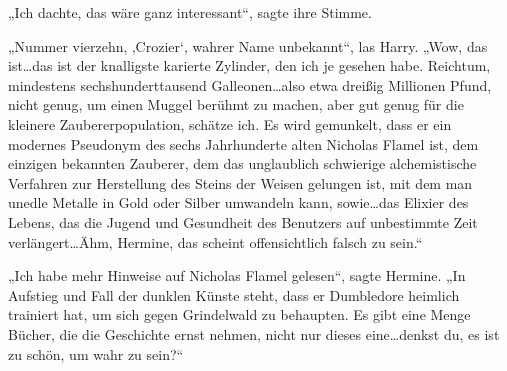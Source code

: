 „Ich dachte, das wäre ganz interessant“, sagte ihre Stimme.

„Nummer vierzehn, ‚Crozier‘, wahrer Name unbekannt“, las Harry. „Wow, das ist…das ist der knalligste karierte Zylinder, den ich je gesehen habe. Reichtum, mindestens sechshunderttausend Galleonen…also etwa dreißig Millionen Pfund, nicht genug, um einen Muggel berühmt zu machen, aber gut genug für die kleinere Zaubererpopulation, schätze ich. Es wird gemunkelt, dass er ein modernes Pseudonym des sechs Jahrhunderte alten Nicholas Flamel ist, dem einzigen bekannten Zauberer, dem das unglaublich schwierige alchemistische Verfahren zur Herstellung des Steins der Weisen gelungen ist, mit dem man unedle Metalle in Gold oder Silber umwandeln kann, sowie…das Elixier des Lebens, das die Jugend und Gesundheit des Benutzers auf unbestimmte Zeit verlängert…Ähm, Hermine, das scheint offensichtlich falsch zu sein.“

„Ich habe mehr Hinweise auf Nicholas Flamel gelesen“, sagte Hermine. „In Aufstieg und Fall der dunklen Künste steht, dass er Dumbledore heimlich trainiert hat, um sich gegen Grindelwald zu behaupten. Es gibt eine Menge Bücher, die die Geschichte ernst nehmen, nicht nur dieses eine…denkst du, es ist zu schön, um wahr zu sein?“

